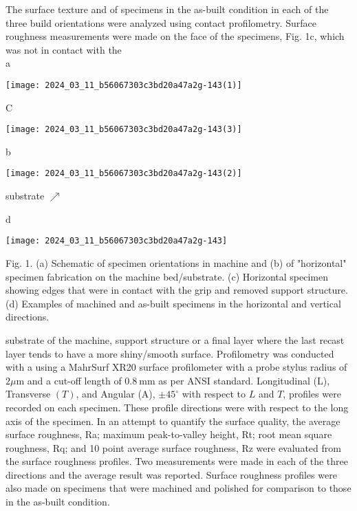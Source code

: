 \documentclass[10pt]{article}
\begin{document}
The surface texture and of specimens in the as-built condition in each of the three build orientations were analyzed using contact profilometry. Surface roughness measurements were made on the face of the specimens, Fig. 1c, which was not in contact with the\\
a

\begin{center}
\texttt{[image: 2024\_03\_11\_b56067303c3bd20a47a2g-143(1)]}
\end{center}

C

\begin{center}
\texttt{[image: 2024\_03\_11\_b56067303c3bd20a47a2g-143(3)]}
\end{center}

b

\begin{center}
\texttt{[image: 2024\_03\_11\_b56067303c3bd20a47a2g-143(2)]}
\end{center}

substrate $\nearrow$

d

\begin{center}
\texttt{[image: 2024\_03\_11\_b56067303c3bd20a47a2g-143]}
\end{center}

Fig. 1. (a) Schematic of specimen orientations in machine and (b) of "horizontal" specimen fabrication on the machine bed/substrate. (c) Horizontal specimen showing edges that were in contact with the grip and removed support structure. (d) Examples of machined and as-built specimens in the horizontal and vertical directions.

substrate of the machine, support structure or a final layer where the last recast layer tends to have a more shiny/smooth surface. Profilometry was conducted with a using a MahrSurf XR20 surface profilometer with a probe stylus radius of $2 \mu \mathrm{m}$ and a cut-off length of $0.8 \mathrm{~mm}$ as per ANSI standard. Longitudinal (L), Transverse $(T)$, and Angular (A), $\pm 45^{\circ}$ with respect to $L$ and $T$, profiles were recorded on each specimen. These profile directions were with respect to the long axis of the specimen. In an attempt to quantify the surface quality, the average surface roughness, Ra; maximum peak-to-valley height, Rt; root mean square roughness, $\mathrm{Rq}$; and 10 point average surface roughness, $\mathrm{Rz}$ were evaluated from the surface roughness profiles. Two measurements were made in each of the three directions and the average result was reported. Surface roughness profiles were also made on specimens that were machined and polished for comparison to those in the as-built condition.
\end{document}

